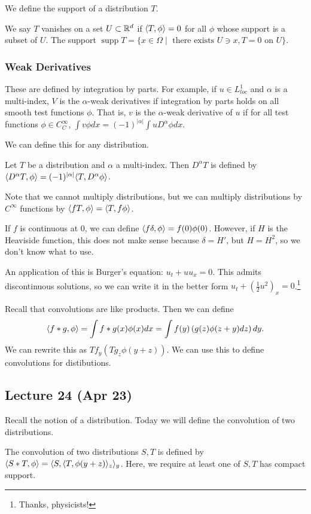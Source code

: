 \documentclass[10pt, twoside]{article}
\begin{document}
    We define the support of a distribution $T$.
    \begin{defn}
        We say $T$ vanishes on a set $U \subset \mathbb{R}^d$ if $\langle T,\phi\rangle = 0$ for all $\phi$ whose support is a subset of $U$. The support $\operatorname{supp} T = \{x \in \Omega \mid \text{ there exists } U \ni x, T = 0 \text{ on } U \}$.
    \end{defn}

    \subsubsection{Weak Derivatives}
    These are defined by integration by parts. For example, if $u \in L^1_{loc}$ and $\alpha$ is a multi-index, $V$ is the $\alpha$-weak derivatives if integration by parts holds on all smooth test functions $\phi$. That is, $v$ is the $\alpha$-weak derivative of $u$ if for all test functions $\phi \in C_C^{\infty}$, $\int v \phi dx = (-1)^{|\alpha|} \int u D^{\alpha} \phi dx$.

    We can define this for any distribution. 
    \begin{defn}
        Let $T$ be a distribution and $\alpha$ a multi-index. Then $D^{\alpha}T$ is defined by $\langle D^{\alpha}T,\phi\rangle = (-1)^{\lvert\alpha\rvert} \langle T,D^{\alpha} \phi\rangle$.
    \end{defn}

    Note that we cannot multiply distributions, but we can multiply distributions by $C^{\infty}$ functions by $\langle fT,\phi\rangle = \langle T,f\phi\rangle$.

    \begin{exm}
        If $f$ is continuous at $0$, we can define $\langle f \delta,\phi\rangle = f(0) \phi(0)$. However, if $H$ is the Heaviside function, this does not make sense because $\delta = H'$, but $H=H^2$, so we don't know what to use.
    \end{exm}

    An application of this is Burger's equation: $u_t+uu_x=0$. This admits discontinuous solutions, so we can write it in the better form $u_t+\left(\frac{1}{2}u^2\right)_x=0$.\footnote{Thanks, physicists!}

    Recall that convolutions are like products. Then we can define \[\langle f*g,\phi\rangle = \int f*g(x) \phi(x) dx = \int f(y) \left( g(z) \phi(z+y) dz \right)dy.\] We can rewrite this as $Tf_y(Tg_z \phi(y+z))$. We can use this to define convolutions for distibutions.

    \subsection{Lecture 24 (Apr 23)}
    Recall the notion of a distribution. Today we will define the convolution of two distributions. 
    \begin{defn}
        The convolution of two distributions $S,T$ is defined by $\langle S*T,\phi\rangle = \langle S,\langle T,\phi(y+z)\rangle_z\rangle_y$. Here, we require at least one of $S,T$ has compact support.
    \end{defn}
\end{document}
